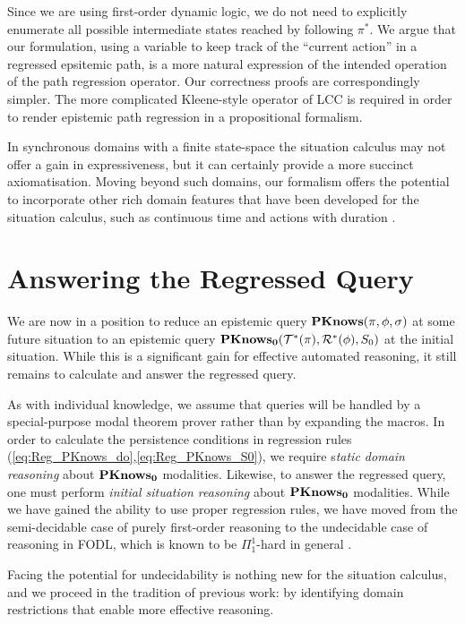 Since we are using first-order dynamic logic, we do not need to explicitly
enumerate all possible intermediate states reached by following $\pi^{*}$.
We argue that our formulation, using a variable to keep track of the
{}``current action'' in a regressed epsitemic path, is a more natural
expression of the intended operation of the path regression operator.
Our correctness proofs are correspondingly simpler. The more complicated
Kleene-style operator of LCC is required in order to render epistemic
path regression in a propositional formalism.

In synchronous domains with a finite state-space the situation calculus
may not offer a gain in expressiveness, but it can certainly provide
a more succinct axiomatisation. Moving beyond such domains, our formalism
offers the potential to incorporate other rich domain features that
have been developed for the situation calculus, such as continuous
time and actions with duration \citep{reiter96sc_nat_conc}. 


\section{Answering the Regressed Query\label{sec:CKnowledge:Reasoning}}

We are now in a position to reduce an epistemic query $\mathbf{PKnows}(\pi,\phi,\sigma)$
at some future situation to an epistemic query $\mathbf{PKnows_{0}}(\mathcal{T}^{*}(\pi),\mathcal{R}^{*}(\phi),S_{0})$
at the initial situation. While this is a significant gain for effective
automated reasoning, it still remains to calculate and answer the
regressed query.

As with individual knowledge, we assume that queries will be handled
by a special-purpose modal theorem prover rather than by expanding
the macros. In order to calculate the persistence conditions in regression
rules (\ref{eq:Reg_PKnows_do},\ref{eq:Reg_PKnows_S0}), we require
s\emph{tatic domain reasoning} about $\mathbf{PKnows_{0}}$ modalities. Likewise,
to answer the regressed query, one must perform \emph{initial situation
reasoning }about $\mathbf{PKnows_{0}}$ modalities. While we have gained the
ability to use proper regression rules, we have moved from the semi-decidable
case of purely first-order reasoning to the undecidable case of reasoning
in FODL, which is known to be $\Pi_{1}^{1}$-hard in general \citep{kooi07dyn_termmodal_logic}. 

Facing the potential for undecidability is nothing new for the situation
calculus, and we proceed in the tradition of previous work: by identifying
domain restrictions that enable more effective reasoning.\\


